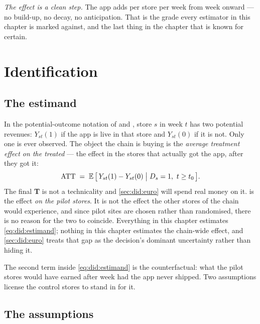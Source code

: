 \emph{The effect is a clean step.} The app adds \eur{\nbEightTrueEffect} per store per week from
week \nbEightLaunch{} onward --- no build-up, no decay, no anticipation. That is the grade every
estimator in this chapter is marked against, and the last thing in the chapter that is known for
certain.

\section{Identification}
\label{sec:did:ident}

\subsection*{The estimand}

In the potential-outcome notation of \citet{rubin1974} and \citet{imbens2015}, store $s$ in week
$t$ has two potential revenues: $Y_{st}(1)$ if the app is live in that store and $Y_{st}(0)$ if it
is not. Only one is ever observed. The object the chain is buying is the \emph{average treatment
effect on the treated} --- the effect in the stores that actually got the app, after they got it:
%
\begin{equation}
  \text{ATT}
  \;=\;
  \operatorname{\mathbb{E}}\big[\, Y_{st}(1) - Y_{st}(0) \;\big|\; D_s = 1,\ t \ge t_0 \,\big].
  \label{eq:did:estimand}
\end{equation}
%
The final \textbf{T} is not a technicality and \cref{sec:did:euro} will spend real money on it.
 is the effect \emph{on the pilot stores}. It is not the effect the other
\nbEightNOther{} stores of the chain would experience, and since pilot sites are chosen rather than randomised,
there is no reason for the two to coincide. Everything in this chapter estimates
\cref{eq:did:estimand}; nothing in this chapter estimates the chain-wide effect, and
\cref{sec:did:euro} treats that gap as the decision's dominant uncertainty rather than hiding it.

The second term inside \cref{eq:did:estimand} is the counterfactual: what the pilot stores would
have earned after week \nbEightLaunch{} had the app never shipped. Two assumptions license the
control stores to stand in for it.

\subsection*{The assumptions}

